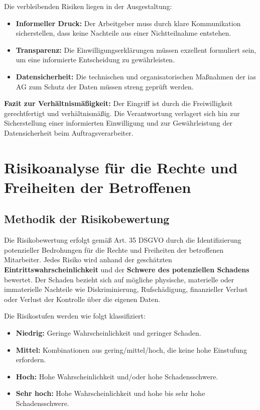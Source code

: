 \documentclass[12pt, a4paper]{article}
\begin{document}
Die verbleibenden Risiken liegen in der Ausgestaltung:
\begin{itemize}
    \item \textbf{Informeller Druck:} Der Arbeitgeber muss durch klare Kommunikation sicherstellen, dass keine Nachteile aus einer Nichtteilnahme entstehen.
    \item \textbf{Transparenz:} Die Einwilligungserklärungen müssen exzellent formuliert sein, um eine informierte Entscheidung zu gewährleisten.
    \item \textbf{Datensicherheit:} Die technischen und organisatorischen Maßnahmen der ias AG zum Schutz der Daten müssen streng geprüft werden.
\end{itemize}

\textbf{Fazit zur Verhältnismäßigkeit:} Der Eingriff ist durch die Freiwilligkeit gerechtfertigt und verhältnismäßig. Die Verantwortung verlagert sich hin zur Sicherstellung einer informierten Einwilligung und zur Gewährleistung der Datensicherheit beim Auftragsverarbeiter.


\section{Risikoanalyse für die Rechte und Freiheiten der Betroffenen}

\subsection{Methodik der Risikobewertung}
Die Risikobewertung erfolgt gemäß Art. 35 DSGVO durch die Identifizierung potenzieller Bedrohungen für die Rechte und Freiheiten der betroffenen Mitarbeiter. Jedes Risiko wird anhand der geschätzten \textbf{Eintrittswahrscheinlichkeit} und der \textbf{Schwere des potenziellen Schadens} bewertet. Der Schaden bezieht sich auf mögliche physische, materielle oder immaterielle Nachteile wie Diskriminierung, Rufschädigung, finanzieller Verlust oder Verlust der Kontrolle über die eigenen Daten.

Die Risikostufen werden wie folgt klassifiziert:
\begin{itemize}
    \item \textbf{Niedrig:} Geringe Wahrscheinlichkeit und geringer Schaden.
    \item \textbf{Mittel:} Kombinationen aus gering/mittel/hoch, die keine hohe Einstufung erfordern.
    \item \textbf{Hoch:} Hohe Wahrscheinlichkeit und/oder hohe Schadensschwere.
    \item \textbf{Sehr hoch:} Hohe Wahrscheinlichkeit und hohe bis sehr hohe Schadensschwere.
\end{itemize}
\end{document}
